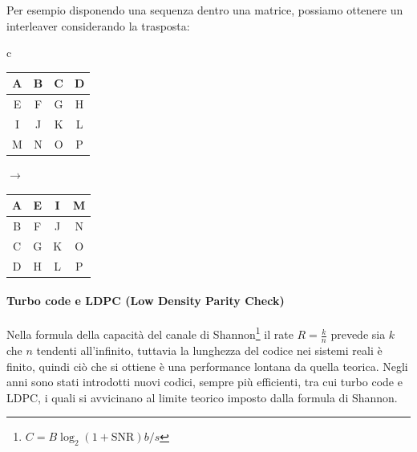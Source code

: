 Per esempio disponendo una sequenza dentro una matrice, possiamo ottenere un interleaver considerando la trasposta:
\begin{table}[h!]
    \centering
    \begin{tabular}{c}
    
    \begin{tabular}{|c|c|c|c|}
    \hline
    A & B & C & D \\ \hline
    E & F & G & H \\ \hline
    I & J & K & L \\ \hline
    M & N & O & P \\ \hline
    \end{tabular}
    
    \quad $\rightarrow$ \quad
    
    \begin{tabular}{|c|c|c|c|}
    \hline
    A & E & I & M \\ \hline
    B & F & J & N \\ \hline
    C & G & K & O \\ \hline
    D & H & L & P \\ \hline
    \end{tabular}
    
    \end{tabular}
\end{table}
   

\begin{center}
\end{center}



\paragraph*{Turbo code e LDPC (Low Density Parity Check)}
Nella formula della capacità del canale di Shannon\footnote{$C=B\log_2(1+\text{SNR}) \si{b/s}$} il rate $R = \frac{k}{n}$ prevede sia $k$ che $n$ tendenti all'infinito, tuttavia la lunghezza del codice nei sistemi reali è finito, quindi ciò che si ottiene è una performance lontana da quella teorica. 
Negli anni sono stati introdotti nuovi codici, sempre più efficienti, tra cui turbo code e LDPC, i quali si avvicinano al limite teorico imposto dalla formula di Shannon.


